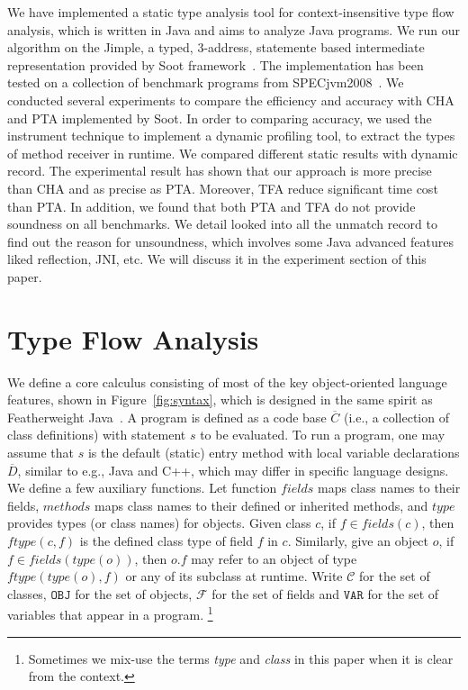 \documentclass{fac}
\newcommand{\keyword}[1]{\mathsf{#1}}
\newcommand{\kwnull}[0]{\keyword{null}}
\newcommand\Var{\mathtt{VAR}}
\newcommand\Val{\mathtt{V}}
\newcommand\Obj{\mathtt{OBJ}}
\newcommand{\Class}{\mathcal{C}}
\newcommand{\Field}{\mathcal{F}}
\newcommand\set[1]{\{#1\}}
\begin{document}
We have implemented a static type analysis tool for context-insensitive type flow analysis, which is written in Java and aims to analyze Java programs. We run our algorithm on the Jimple, a typed, 3-address, statemente based intermediate representation provided by Soot framework~\cite{soot}. The implementation has been tested on a collection of benchmark programs from SPECjvm2008~\cite{specjvm}. We conducted several experiments to compare the efficiency and accuracy with CHA and PTA implemented by Soot. In order to comparing accuracy, we used the instrument technique to implement a dynamic profiling tool, to extract the types of method receiver in runtime. We compared different static results with dynamic record. The experimental result has shown that our approach is more precise than CHA and as precise as PTA. Moreover, TFA reduce significant time cost than PTA. In addition, we found that both PTA and TFA do not provide soundness on all benchmarks. We detail looked into all the unmatch record to find out the reason for unsoundness, which involves some Java advanced features liked reflection, JNI, etc. We will discuss it in the experiment section of this paper. %

\section{Type Flow Analysis}\label{sec:type-flow-analysis}
We define a core calculus consisting of most of the key object-oriented language features, shown in Figure~\ref{fig:syntax}, which is designed in the same spirit as Featherweight Java~\cite{Igarashi2001}.
A program is defined as a code base $\overline{C}$ (i.e., a collection of class definitions) with statement $s$ to be evaluated.
To run a program, one may assume that $s$ is the default (static) entry method with local variable declarations $\overline{D}$,
similar to e.g., Java and C++, which may differ in specific language designs.
We define a few auxiliary functions. Let function $fields$ maps class names to their fields, $methods$ maps class names to their defined or inherited methods, and $type$ provides types (or class names) for objects. Given class $c$, if $f\in fields(c)$, then $ftype(c,f)$ is the defined class type of field $f$ in $c$. Similarly, give an object $o$, if $f\in fields(type(o))$, then $o.f$ may refer to an object of type $ftype(type(o),f)$ or %
any of its subclass at runtime. Write $\Class$ for the set of classes, $\Obj$ for the set of objects, $\Field$ for the set of fields and $\Var$ for the set of variables that appear in a program.
\footnote{Sometimes we mix-use the terms \emph{type} and \emph{class} in this paper when it is clear from the context.}
\end{document}
